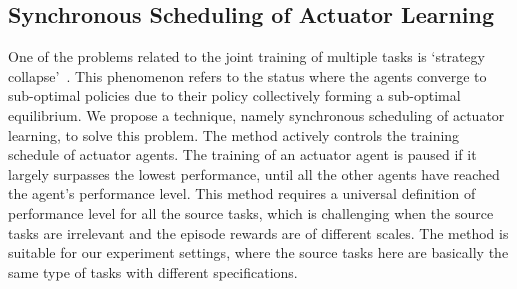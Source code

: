 \subsection{Synchronous Scheduling of Actuator Learning}
One of the problems related to the joint training of multiple tasks is `strategy collapse'~\cite{openai_2018}. This phenomenon refers to the status where the agents converge to sub-optimal policies due to their policy collectively forming a sub-optimal equilibrium. We propose a technique, namely synchronous scheduling of actuator learning, to solve this problem. The method actively controls the training schedule of actuator agents. The training of an actuator agent is paused if it largely surpasses the lowest performance, until all the other agents have reached the agent's performance level. This method requires a universal definition of performance level for all the source tasks, which is challenging when the source tasks are irrelevant and the episode rewards are of different scales. The method is suitable for our experiment settings, where the source tasks here are basically the same type of tasks with different specifications. 


